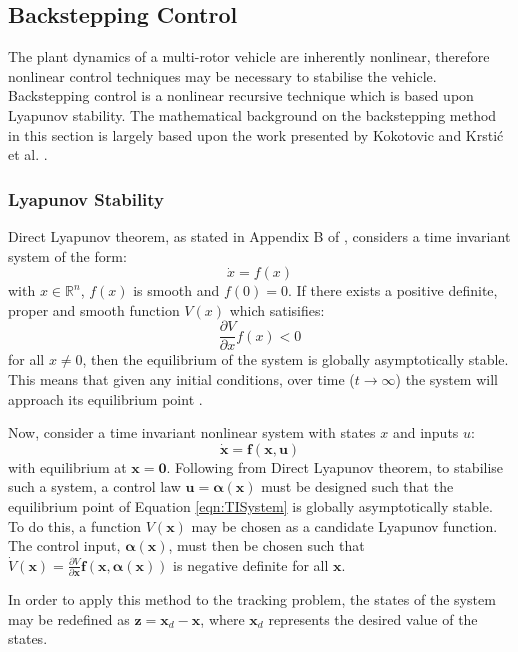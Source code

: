 \subsection{Backstepping Control}\label{section:BacksteppingBackground}
The plant dynamics of a multi-rotor vehicle are inherently nonlinear, therefore nonlinear control techniques may be necessary to stabilise the vehicle. Backstepping control is a nonlinear recursive technique which is based upon Lyapunov stability. The mathematical background on the backstepping method in this section is largely based upon the work presented by Kokotovic \cite{1992a} and Krsti\'c et al. \cite{Krstic1995}.

\subsubsection{Lyapunov Stability}
Direct Lyapunov theorem, as stated in Appendix B of \cite{Isidori1995}, considers a time invariant system of the form:
\[\dot{x}=f(x)\]
with $x\in\mathbb{R}^{n}$, $f(x)$ is smooth and $f(0)=0$. If there exists a positive definite, proper and smooth function $V(x)$ which satisifies:
\[\frac{\partial V}{\partial x}f(x)<0\]
for all $x\neq0$, then the equilibrium of the system is globally asymptotically stable. This means that given any initial conditions, over time ($t\rightarrow\infty$) the system will approach its equilibrium point \cite{Chen1999}. 

Now, consider a time invariant nonlinear system with states $x$ and inputs $u$:
\begin{equation}\label{eqn:TISystem}
\mathbf{\dot{x}}=\mathbf{f}(\mathbf{x},\mathbf{u})
\end{equation}
with equilibrium at $\mathbf{x}=\mathbf{0}$. Following from Direct Lyapunov theorem, to stabilise such a system, a control law $\mathbf{u}=\mathbf{\alpha}(\mathbf{x})$ must be designed such that the equilibrium point of Equation \ref{eqn:TISystem} is globally asymptotically stable. To do this, a function $V(\mathbf{x})$ may be chosen as a candidate Lyapunov function. The control input, $\mathbf{\alpha}(\mathbf{x})$, must then be chosen such that $\dot{V}(\mathbf{x})=\frac{\partial V}{\partial \mathbf{x}}\mathbf{f}(\mathbf{x},\mathbf{\alpha}(\mathbf{x}))$ is negative definite for all $\mathbf{x}$. 

In order to apply this method to the tracking problem, the states of the system may be redefined as $\mathbf{z}=\mathbf{x}_{d}-\mathbf{x}$, where $\mathbf{x}_{d}$ represents the desired value of the states.


